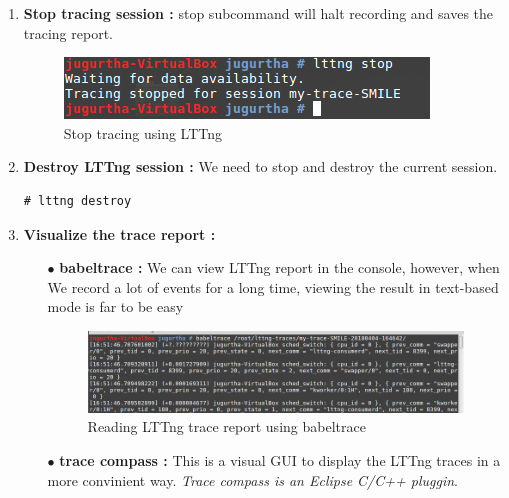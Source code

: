 \begin{enumerate}
	\item \textbf{Stop tracing session :} stop subcommand will halt recording and saves the tracing report.
		\begin{figure}[H]
			\centering
        	\includegraphics[scale=0.32]{img/solution/lttng-stop-session.png}
        	\caption{Stop tracing using LTTng}
        	\label{Stop tracing using LTTng}
    	\end{figure}
	
	\item \textbf{Destroy LTTng session :} We need to stop and destroy the current session.
			\begin{lstlisting}[style=BashInputStyle]
# lttng destroy
	\end{lstlisting}
	
		\item \textbf{Visualize the trace report : } 
		
			\begin{itemize}
				\item[$\bullet$] \textbf{babeltrace : } We can view LTTng report in the console, however, when We record a lot of events for a
long time, viewing the result in text-based mode is far to be easy
		\begin{figure}[H]
			\centering
        	\includegraphics[scale=0.32]{img/solution/babel-trace.png}
        	\caption{Reading LTTng trace report using babeltrace}
        	\label{Reading LTTng trace report using babeltrace}
    	\end{figure}				
				
				
				\item[$\bullet$] \textbf{trace compass : } This is a visual GUI to display the LTTng traces in a more convinient way. \emph{\color{orange}Trace compass is an Eclipse C/C++ pluggin}.
			\end{itemize}
\end{enumerate}




